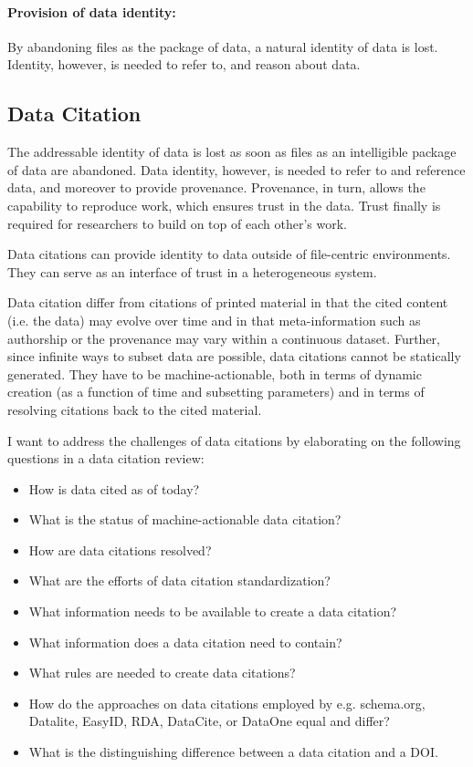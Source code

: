 \documentclass[a4paper,10pt]{article}
\begin{document}
\paragraph{Provision of data identity:}
By abandoning files as the package of data, a natural identity of data is lost. Identity, however, is needed to refer to, and reason about data.


\subsection{Data Citation}
The addressable identity of data is lost as soon as files as an intelligible package of data are abandoned.
Data identity, however, is needed to refer to and reference data, and moreover to provide provenance. Provenance, in turn, allows the capability to reproduce work,
which ensures trust in the data. 
Trust finally is required for researchers to build on top of each other's work.

Data citations can provide identity to data outside of file-centric environments. They can serve as an interface of trust in a heterogeneous system. 


Data citation differ from citations of printed material 
in that the cited content (i.e. the data) may evolve over time and in that meta-information such as authorship or the provenance may vary within a continuous dataset. Further, since infinite ways to subset data are possible, data citations cannot be statically generated. They have to be machine-actionable, both in terms of dynamic creation (as a function of time and subsetting parameters) and in terms of resolving citations back to the cited material.

I want to address the challenges of data citations by elaborating on the following questions in a data citation review:

\begin{itemize}
    \item   How is data cited as of today? 
    \item   What is the status of machine-actionable data citation? 
    \item   How are data citations resolved?
    \item   What are the efforts of data citation standardization? 
    \item   What information needs to be available to create a data citation?
    \item   What information does a data citation need to contain?
    \item   What rules are needed to create data citations?    
    \item   How do the approaches on data citations employed by e.g. schema.org, Datalite,  EasyID, RDA, DataCite, or DataOne equal and differ?    
    \item   What is the distinguishing difference between a data citation and a \gls{DOI}.
\end{itemize}
\end{document}
